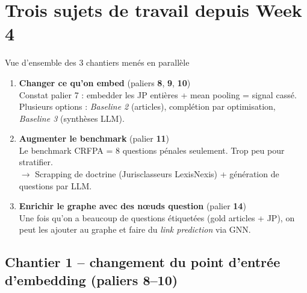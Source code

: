 \documentclass[aspectratio=169,10pt]{beamer}
\begin{document}
\section{Trois sujets de travail depuis Week 4}

\begin{frame}{Vue d'ensemble des 3 chantiers menés en parallèle}
  \footnotesize
  \begin{enumerate}\setlength\itemsep{0.6em}
    \item \textbf{Changer ce qu'on embed} \hfill (paliers \textbf{8}, \textbf{9}, \textbf{10})
    \\ Constat palier 7 : embedder les JP entières + mean pooling = signal cassé.
    \\ Plusieurs options : \emph{Baseline 2} (articles), complétion par optimisation, \emph{Baseline 3} (synthèses LLM).

    \item \textbf{Augmenter le benchmark} \hfill (palier \textbf{11})
    \\ Le benchmark CRFPA = 8 questions pénales seulement. Trop peu pour stratifier.
    \\ $\to$ Scrapping de doctrine (Jurisclasseurs LexisNexis) + génération de questions par LLM.

    \item \textbf{Enrichir le graphe avec des nœuds \og question \fg} \hfill (palier \textbf{14})
    \\ Une fois qu'on a beaucoup de questions étiquetées (gold articles + JP),
    on peut les ajouter au graphe et faire du \emph{link prediction} via GNN.
  \end{enumerate}
\end{frame}

\subsection{Chantier 1 -- changement du point d'entrée d'embedding (paliers 8--10)}
\end{document}
